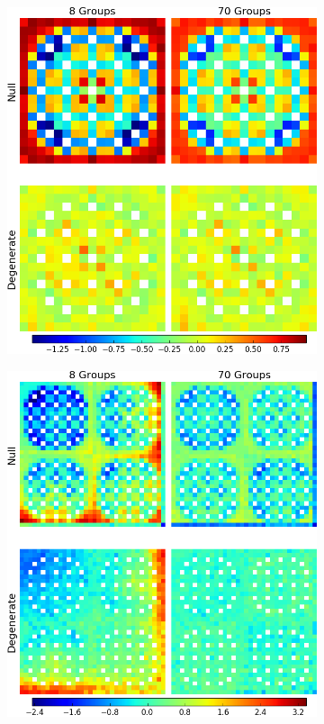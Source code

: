 \begin{figure}[h!]
\centering
\begin{subfigure}{0.35\textwidth}
  \includegraphics[width=\linewidth]{figures/assembly/capture-errors}
  \caption{}
  \label{fig:assm-capt-error}
\end{subfigure}
\begin{subfigure}{0.35\textwidth}
  \centering
  \includegraphics[width=\linewidth]{figures/reflector/capture-errors}

\end{subfigure}
\end{figure}
